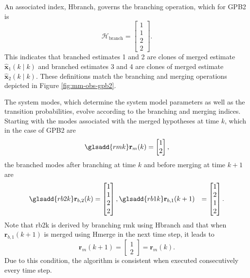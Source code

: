 An associated index, \gls{Hbranch}, governs the branching operation, which for \gls{GPB2} is
\begin{equation} \label{eq:Hbranch_GPB2}
	\mathcal{H}_{\text{branch}} = \begin{bmatrix} 1 \\ 1 \\ 2 \\ 2 \end{bmatrix}.
\end{equation}
This indicates that branched estimates 1 and 2 are clones of merged estimate $\mathbf{\hat{x}}_1(k \mid k)$ and branched estimates 3 and 4 are clones of merged estimate $\mathbf{\hat{x}}_2(k \mid k)$. These definitions match the branching and merging operations depicted in Figure \ref{fig:mm-obs-gpb2}.

The system modes, which determine the system model parameters as well as the transition probabilities, evolve according to the branching and merging indices. Starting with the modes associated with the merged hypotheses at time $k$, which in the case of GPB2 are
\begin{equation} \label{eq:rmk_GPB2}
		\glsadd{rmk}\mathbf{r}_m(k) = \begin{bmatrix} 1 \\ 2 \end{bmatrix},
\end{equation}
the branched modes after branching at time $k$ and before merging at time $k+1$ are
\begin{equation} \label{eq:rbk_GPB2}
	\begin{aligned}
		\glsadd{rb2k}\mathbf{r}_{b,2}(k) &= \begin{bmatrix} 1 \\ 1 \\ 2 \\ 2 \end{bmatrix},
		\glsadd{rb1k}\mathbf{r}_{b,1}(k+1) &= \begin{bmatrix} 1 \\ 2 \\ 1 \\ 2 \end{bmatrix}.
	\end{aligned}
\end{equation}
Note that \gls{rb2k} is derived by branching \gls{rmk} using \gls{Hbranch} and that when $\mathbf{r}_{b,1}(k+1)$ is merged using \gls{Hmerge} in the next time step, it leads to 
\begin{equation} \label{eq:rmkp1rmk_GPB2}
	\mathbf{r}_m(k+1) = \begin{bmatrix} 1 \\ 2 \end{bmatrix} = \mathbf{r}_m(k).
\end{equation}
Due to this condition, the algorithm is consistent when executed consecutively every time step.

